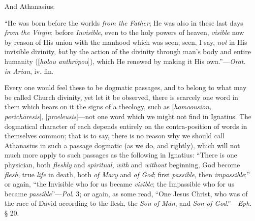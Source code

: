 And Athanasius:

``He was born before
the worlds \emph{from the Father}; He was also in these last days \emph{from
the Virgin}; before \emph{Invisible}, even to the holy powers of
heaven, \emph{visible} now by reason of His union with the manhood
which was seen; seen, I say, \emph{not} in His invisible divinity, \emph{but}
by the action of the divinity through man's body and entire humanity
([\emph{holou anthr\={o}pou}]), which He renewed by making it His
own.''—\emph{Orat. in Arian}, iv. fin.

Every one would feel these to be dogmatic
passages, and to belong to what may be called Church divinity,
yet let it be observed, there is scarcely one word in them which bears
on it the signs of a theology, such as [\emph{homoousion, perich\={o}resis}],
[\emph{proeleusis}]—not one word which we might not find in
Ignatius. The dogmatical character of each depends entirely on the
contra-position of words in themselves common; that is to say, there
is no reason why we should call Athanasius in such a passage dogmatic
(as we do, and rightly), which will not much more apply to such
passages as the following in Ignatius: ``There is one physician, both \emph{fleshly}
and \emph{spiritual}, \emph{with} and \emph{without} beginning, God
become \emph{flesh}, true \emph{life} in death, both \emph{of Mary}
and \emph{of God}; first \emph{passible}, then \emph{impassible};'' or
again, ``the Invisible who for us became \emph{visible}; the Impassible
who for us became \emph{passible}''—\emph{Pol}. 3; or again, as some
read, ``One Jesus Christ, who was of the race of David according to the
flesh, the \emph{Son of Man}, and \emph{Son of God}.''—\emph{Eph}. §
20.

